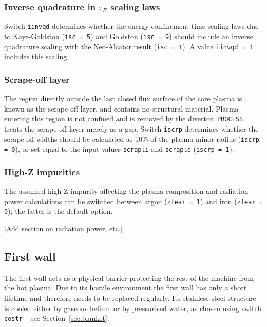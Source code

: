 \documentclass[11pt,a4paper]{report}
\newcommand{\process}{\mbox{\texttt{PROCESS}}}
\begin{document}
\subsubsection*{Inverse quadrature in $\tau_E$ scaling laws}

Switch \texttt{iinvqd} determines whether the energy confinement time scaling
laws due to Kaye-Goldston (\texttt{isc = 5}) and Goldston (\texttt{isc = 9})
should include an inverse quadrature scaling with the Neo-Alcator result
(\texttt{isc = 1}). A value \texttt{iinvqd = 1} includes this scaling.

\subsubsection*{Scrape-off layer}

The region directly outside the last closed flux surface of the core plasma is
known as the scrape-off layer, and contains no structural material.  Plasma
entering this region is not confined and is removed by the
divertor. \process\/ treats the scrape-off layer merely as a gap. Switch
\texttt{iscrp} determines whether the scrape-off widths should be calculated
as 10\% of the plasma minor radius (\texttt{iscrp = 0}), or set equal to the
input values \texttt{scrapli} and \texttt{scraplo} (\texttt{iscrp = 1}).

\subsubsection*{High-Z impurities}

The assumed high-Z impurity affecting the plasma composition and radiation
power calculations can be switched between argon (\texttt{zfear = 1}) and iron
(\texttt{zfear = 0}); the latter is the default option.

[Add section on radiation power, etc.]

\subsection{First wall}

The first wall acts as a physical barrier protecting the rest of the machine
from the hot plasma. Due to its hostile environment the first wall has only a
short lifetime and therefore needs to be replaced regularly. Its stainless
steel structure is cooled either by gaseous helium or by pressurised water, as
chosen using switch \texttt{costr} -- see Section~\ref{sec:blanket}.
\end{document}

